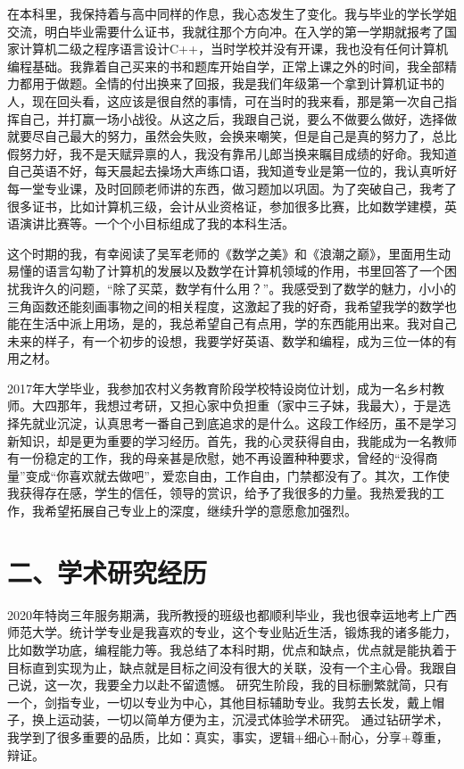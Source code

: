 \documentclass[cs5size]{article}
\begin{document}
在本科里，我保持着与高中同样的作息，我心态发生了变化。我与毕业的学长学姐交流，明白毕业需要什么证书，我就往那个方向冲。在入学的第一学期就报考了国家计算机二级之程序语言设计C++，当时学校并没有开课，我也没有任何计算机编程基础。我靠着自己买来的书和题库开始自学，正常上课之外的时间，我全部精力都用于做题。全情的付出换来了回报，我是我们年级第一个拿到计算机证书的人，现在回头看，这应该是很自然的事情，可在当时的我来看，那是第一次自己指挥自己，并打赢一场小战役。从这之后，我跟自己说，要么不做要么做好，选择做就要尽自己最大的努力，虽然会失败，会换来嘲笑，但是自己是真的努力了，总比假努力好，我不是天赋异禀的人，我没有靠吊儿郎当换来瞩目成绩的好命。我知道自己英语不好，每天晨起去操场大声练口语，我知道专业是第一位的，我认真听好每一堂专业课，及时回顾老师讲的东西，做习题加以巩固。为了突破自己，我考了很多证书，比如计算机三级，会计从业资格证，参加很多比赛，比如数学建模，英语演讲比赛等。一个个小目标组成了我的本科生活。

这个时期的我，有幸阅读了吴军老师的《数学之美》和《浪潮之巅》，里面用生动易懂的语言勾勒了计算机的发展以及数学在计算机领域的作用，书里回答了一个困扰我许久的问题，“除了买菜，数学有什么用？”。我感受到了数学的魅力，小小的三角函数还能刻画事物之间的相关程度，这激起了我的好奇，我希望我学的数学也能在生活中派上用场，是的，我总希望自己有点用，学的东西能用出来。我对自己未来的样子，有一个初步的设想，我要学好英语、数学和编程，成为三位一体的有用之材。

2017年大学毕业，我参加农村义务教育阶段学校特设岗位计划，成为一名乡村教师。大四那年，我想过考研，又担心家中负担重（家中三子妹，我最大），于是选择先就业沉淀，认真思考一番自己到底追求的是什么。这段工作经历，虽不是学习新知识，却是更为重要的学习经历。首先，我的心灵获得自由，我能成为一名教师有一份稳定的工作，我的母亲甚是欣慰，她不再设置种种要求，曾经的“没得商量”变成“你喜欢就去做吧”，爱恋自由，工作自由，门禁都没有了。其次，工作使我获得存在感，学生的信任，领导的赏识，给予了我很多的力量。我热爱我的工作，我希望拓展自己专业上的深度，继续升学的意愿愈加强烈。

\section*{二、学术研究经历}

2020年特岗三年服务期满，我所教授的班级也都顺利毕业，我也很幸运地考上广西师范大学。统计学专业是我喜欢的专业，这个专业贴近生活，锻炼我的诸多能力，比如数学功底，编程能力等。我总结了本科时期，优点和缺点，优点就是能执着于目标直到实现为止，缺点就是目标之间没有很大的关联，没有一个主心骨。我跟自己说，这一次，我要全力以赴不留遗憾。
研究生阶段，我的目标删繁就简，只有一个，剑指专业，一切以专业为中心，其他目标辅助专业。我剪去长发，戴上帽子，换上运动装，一切以简单方便为主，沉浸式体验学术研究。
通过钻研学术，我学到了很多重要的品质，比如：真实，事实，逻辑+细心+耐心，分享+尊重，辩证。
\end{document}
